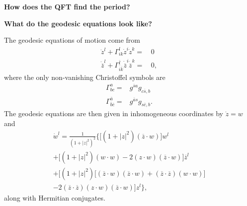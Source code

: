 \documentclass{slides}
\begin{document}
\begin{center}
\textbf{How does the QFT find the period?}
\end{center}

\pagebreak


\begin{center}
\textbf{What do the geodesic equations look like?}
\end{center}

The geodesic equations of motion come from
\begin{equation*}
\begin{split}
    \ddot{z}^l + \Gamma^l_{ik}\dot{z}^i\dot{z}^k =&\, 0\\
    \ddot{\overline{z}}^l + \Gamma^{\overline{l}}_{\overline{i}\overline{k}}
            \dot{\overline{z}}^i\dot{\overline{z}}^k =&\, 0,
\end{split}
\label{e:geodesics}
\end{equation*}
where the only non-vanishing Christoffel symbols are
\begin{equation*}
\begin{split}
    \Gamma^a_{bc} =& g^{\overline{s}a} g_{c\overline{s},b}\\
    \Gamma^{\overline{a}}_{\overline{b}\overline{c}} =& g^{\overline{a}s} 
                            g_{s\overline{c},b}.
\end{split}
\label{e:xsymb}
\end{equation*}
The geodesic equations are then given in inhomogeneous coordinates by
$\dot{z}=w$ and
\begin{multline*}
    \dot{w}^l = \frac{1}{ \left( 1 + \left| z\right|^2 \right)^2 }
        \biggl\lbrace
            \biggl[ \left( 1 + \left| z\right|^2 \right) 
                    \left( \overline{z}\cdot w \right)
            \biggr] w^l\\
            +
            \biggl[ \left( 1 + \left| z\right|^2 \right)\left( w\cdot w \right)
                    - 2\left( z\cdot w \right)\left( \overline{z}\cdot w \right)
            \biggr] \overline{z}^l\\
            +
            \biggl[ \left( 1 + \left| z\right|^2 \right) 
                    \bigl[ 
                      \left(\overline{z}\cdot w\right)\left(\overline{z}\cdot w\right)
                      +\left(\overline{z}\cdot\overline{z}\right)\left(w\cdot w\right)
                    \bigr]\\
                    - 2\left(\overline{z}\cdot\overline{z}\right) 
                        \left( z\cdot w \right)\left( \overline{z}\cdot w \right)
            \biggr] z^l
        \biggr\rbrace,
\label{e:detailedGeodesics}
\end{multline*}
along with Hermitian conjugates.


\pagebreak
\end{document}
